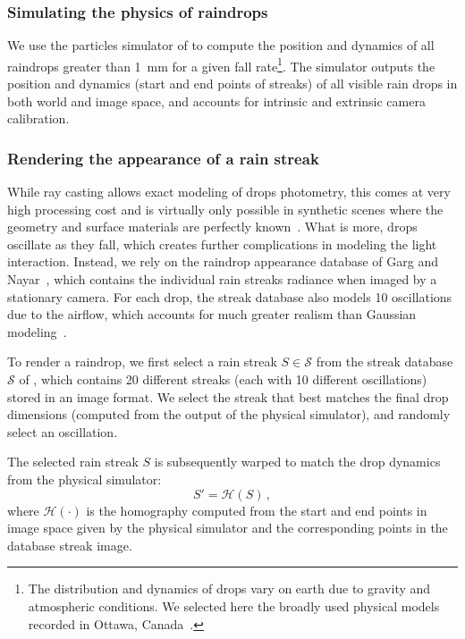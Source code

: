 \subsubsection{Simulating the physics of raindrops}
\label{sec:raindrop-position}

We use the particles simulator of \cite{de2012fast} to compute the position and dynamics of all raindrops greater than 1~mm for a given fall rate\footnote{The distribution and dynamics of drops vary on earth due to gravity and atmospheric conditions. We selected here the broadly used physical models recorded in Ottawa, Canada~\cite{marshall1948distribution,atlas1973doppler}.}. 
The simulator outputs the position and dynamics (start and end points of streaks) of all visible rain drops in both world and image space, and accounts for intrinsic and extrinsic camera calibration.

\subsubsection{Rendering the appearance of a rain streak}
\label{sec:rwa_appearance}

While ray casting allows exact modeling of drops photometry, this comes at very high processing cost and is virtually only possible in synthetic scenes where the geometry and surface materials are perfectly known~\cite{rousseau2006realistic,halimeh2009raindrop}. What is more, drops oscillate as they fall, which creates further complications in modeling the light interaction. Instead, we rely on the raindrop appearance database of Garg and Nayar~\cite{garg2007vision}, which contains the individual rain streaks radiance when imaged by a stationary camera. For each drop, the streak database also models 10 oscillations due to the airflow, which accounts for much greater realism than Gaussian modeling~\cite{barnum2010analysis}. 

To render a raindrop, we first select a rain streak $S \in \mathcal{S}$ from the streak database $\mathcal{S}$ of \cite{garg2006photorealistic}, which contains 20 different streaks (each with 10 different oscillations) stored in an image format. 
We select the streak that best matches the final drop dimensions (computed from the output of the physical simulator), and randomly select an oscillation. 

The selected rain streak $S$ is subsequently warped to match the drop dynamics from the physical simulator: 
\begin{equation}
S' = \mathcal{H}(S) \,,
\label{eq:drop_warp}
\end{equation}
where $\mathcal{H}(\cdot)$ is the homography computed from the start and end points in image space given by the physical simulator and the corresponding points in the database streak image.

